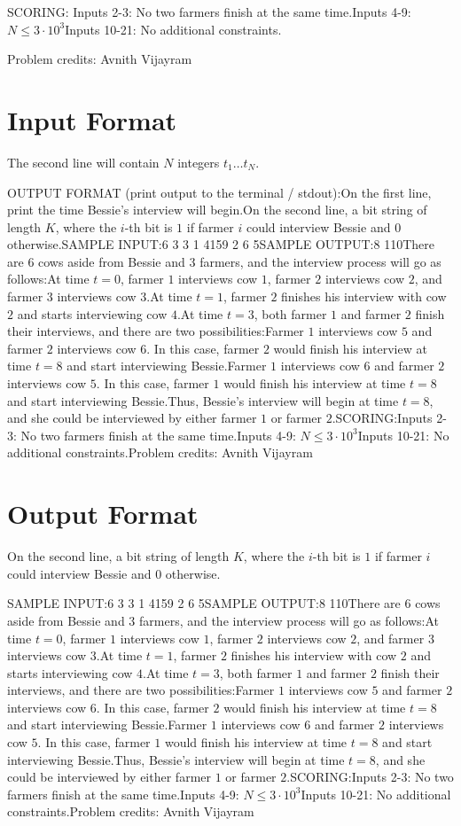 \documentclass[12pt]{article}
\begin{document}
SCORING:
Inputs 2-3: No two farmers finish at the same time.Inputs 4-9: $N\le 3\cdot 10^3$Inputs 10-21: No additional constraints.


Problem credits: Avnith Vijayram



\section*{Input Format}
The second line will contain $N$ integers $t_1 \dots t_N$.

OUTPUT FORMAT (print output to the terminal / stdout):On the first line, print the time Bessie's interview will begin.On the second line, a bit string of length $K$, where the $i$-th bit is $1$ if
farmer $i$ could interview Bessie and $0$ otherwise.SAMPLE INPUT:6 3
3 1 4159 2 6 5SAMPLE OUTPUT:8
110There are $6$ cows aside from Bessie and $3$ farmers, and the interview process will go as
follows:At time $t = 0$, farmer $1$ interviews cow $1$, farmer $2$ interviews cow
$2$, and farmer $3$ interviews cow $3$.At time $t = 1$, farmer $2$
finishes his interview with cow $2$ and starts interviewing cow $4$.At time $t = 3$, both farmer $1$ and farmer $2$ finish their interviews, and
there are two possibilities:Farmer $1$ interviews cow $5$ and
farmer $2$ interviews cow $6$. In this case, farmer $2$ would finish his
interview at time $t = 8$ and start interviewing Bessie.Farmer
$1$ interviews cow $6$ and farmer $2$ interviews cow $5$. In this case, farmer
$1$ would finish his interview at time $t = 8$ and start interviewing
Bessie.Thus, Bessie's interview will begin at time $t = 8$, and she could be
interviewed by either farmer $1$ or farmer $2$.SCORING:Inputs 2-3: No two farmers finish at the same time.Inputs 4-9: $N\le 3\cdot 10^3$Inputs 10-21: No additional constraints.Problem credits: Avnith Vijayram

\section*{Output Format}
On the second line, a bit string of length $K$, where the $i$-th bit is $1$ if
farmer $i$ could interview Bessie and $0$ otherwise.

SAMPLE INPUT:6 3
3 1 4159 2 6 5SAMPLE OUTPUT:8
110There are $6$ cows aside from Bessie and $3$ farmers, and the interview process will go as
follows:At time $t = 0$, farmer $1$ interviews cow $1$, farmer $2$ interviews cow
$2$, and farmer $3$ interviews cow $3$.At time $t = 1$, farmer $2$
finishes his interview with cow $2$ and starts interviewing cow $4$.At time $t = 3$, both farmer $1$ and farmer $2$ finish their interviews, and
there are two possibilities:Farmer $1$ interviews cow $5$ and
farmer $2$ interviews cow $6$. In this case, farmer $2$ would finish his
interview at time $t = 8$ and start interviewing Bessie.Farmer
$1$ interviews cow $6$ and farmer $2$ interviews cow $5$. In this case, farmer
$1$ would finish his interview at time $t = 8$ and start interviewing
Bessie.Thus, Bessie's interview will begin at time $t = 8$, and she could be
interviewed by either farmer $1$ or farmer $2$.SCORING:Inputs 2-3: No two farmers finish at the same time.Inputs 4-9: $N\le 3\cdot 10^3$Inputs 10-21: No additional constraints.Problem credits: Avnith Vijayram
\end{document}
